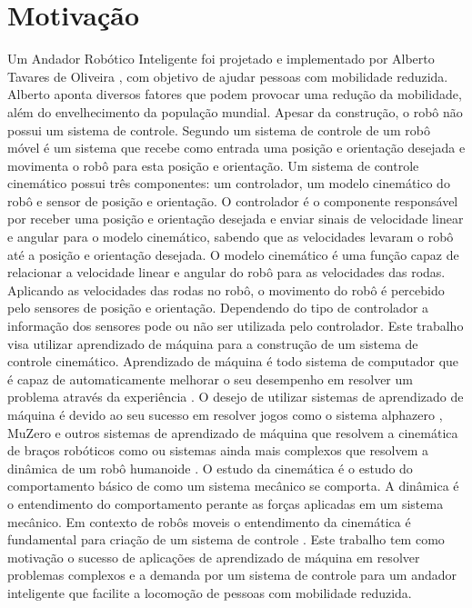 \label{Cap:Introducao}

\section{Motivação}

Um Andador Robótico Inteligente foi projetado e implementado
por Alberto Tavares de Oliveira \cite{oliveira2022projeto},
com objetivo de ajudar pessoas com mobilidade reduzida. Alberto aponta
diversos fatores que podem provocar uma redução da mobilidade, além do 
envelhecimento da população mundial. Apesar da construção,
o robô não possui um sistema de controle. Segundo \cite{siegwart2011introduction}
um sistema de controle de um robô móvel é um sistema que recebe
como entrada uma posição e orientação desejada e movimenta o robô
para esta posição e orientação. Um sistema de controle cinemático possui
três componentes: um controlador, um modelo cinemático do robô e sensor de
posição e orientação. O controlador é o componente responsável
por receber uma posição e orientação desejada e enviar sinais de velocidade linear 
e angular para o modelo cinemático, sabendo que as velocidades levaram o 
robô até a posição e orientação desejada. O modelo cinemático é uma função
capaz de relacionar a velocidade linear e angular do robô para as velocidades
das rodas. Aplicando as velocidades das rodas no robô, o movimento do
robô é percebido pelo sensores de posição e orientação. Dependendo do tipo de controlador
a informação dos sensores pode ou não ser utilizada pelo controlador. Este trabalho visa
utilizar aprendizado de máquina para a construção de um sistema de controle cinemático.
Aprendizado de máquina é todo sistema de computador que é capaz de
automaticamente melhorar o seu desempenho em resolver um problema através
da experiência \cite{mitchell1997machine}.
O desejo de utilizar sistemas de aprendizado de máquina é devido ao seu sucesso
em
resolver jogos como o sistema alphazero \cite{silver2017mastering}, MuZero
\cite{schrittwieser2020mastering} e outros sistemas de aprendizado de máquina
que resolvem a cinemática de braços robóticos como \cite{cavalcanti2017self}
ou sistemas ainda mais complexos que resolvem a dinâmica de um robô humanoide
\cite{phaniteja2017deep}. O estudo da cinemática é o estudo do comportamento
básico de como um sistema mecânico se comporta. A dinâmica é o entendimento
do comportamento perante as forças aplicadas em um sistema mecânico. Em contexto
de robôs moveis o entendimento da cinemática é fundamental para criação de um
sistema de controle \cite{siegwart2011introduction}. Este trabalho tem como
motivação o sucesso de aplicações de aprendizado de máquina em resolver problemas
complexos e a demanda por um sistema de controle para um andador
inteligente que facilite a locomoção de pessoas com mobilidade reduzida. 

